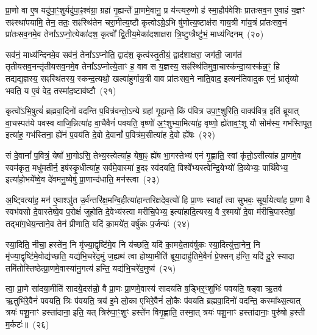 प्रा॒णो वा ए॒ष यदु॑पा॒ꣳ॒शुर्यदु॑पा॒ꣴ॒श्व॑ग्रा॒ ग्रहा॑ गृ॒ह्यन्ते᳚ प्रा॒णमे॒वानु॒ प्र य॑न्त्यरु॒णो ह॑ स्मा॒हौप॑वेशिः प्रातःसव॒न ए॒वाहं य॒ज्ञꣳ सꣴस्था॑पयामि॒ तेन॒ ततः॒ सꣴस्थि॑तेन चरा॒मीत्य॒ष्टौ कृत्वो\-ऽग्रे॒\-ऽभि षु॑णोत्य॒ष्टाक्ष॑रा गाय॒त्री गा॑य॒त्रं प्रा॑तःसव॒नं प्रा॑तःसव॒नमे॒व तेना᳚\-ऽऽ\-प्नो॒त्येका॑\-दश॒ कृत्वो᳚ द्वि॒तीय॒मेका॑\-दशाक्षरा त्रि॒ष्टुप्त्रैष्टु॑भं॒ माध्य॑न्दिनम्~(२०)\ip

सव॑नं॒ माध्य॑न्दिनमे॒व सव॑नं॒ तेना᳚\-ऽऽ\-प्नोति॒ द्वाद॑श॒ कृत्व॑स्तृ॒तीयं॒ द्वाद॑शाक्षरा॒ जग॑ती॒ जाग॑तं तृतीय\-सव॒नन्तृ॑तीय\-सव॒नमे॒व तेना᳚\-ऽऽ\-प्नोत्ये॒ताꣳ ह॒ वाव स य॒ज्ञस्य॒ सꣴस्थि॑तिमुवा॒चास्क॑न्दा॒यास्क॑न्न॒ꣳ॒ हि तद्यद्य॒ज्ञस्य॒ सꣴस्थि॑तस्य॒ स्कन्द॒त्यथो॒ खल्वा॑हुर्गाय॒त्री वाव प्रा॑तःसव॒ने नाति॒वाद॒ इत्यन॑तिवादुक एनं॒ भ्रातृ॑व्यो भवति॒ य ए॒वं वेद॒ तस्मा॑द॒ष्टाव॑ष्टौ~(२१)\ip

कृत्वो॑\-ऽभि॒षुत्यं॑ ब्रह्मवा॒दिनो॑ वदन्ति प॒वित्र॑वन्तो॒\-ऽन्ये ग्रहा॑ गृ॒ह्यन्ते॒ किं प॑वित्र उपा॒ꣳ॒शुरिति॒ वाक्प॑वित्र॒ इति॑ ब्रूयात् वा॒चस्पत॑ये पवस्व वाजि॒न्नित्या॑ह वा॒चैवैनं॑ पवयति॒ वृष्णो॑ अ॒ꣳ॒शुभ्या॒मित्या॑ह॒ वृष्णो॒ ह्ये॑ताव॒ꣳ॒शू यौ सोम॑स्य॒ गभ॑स्तिपूत॒ इत्या॑ह॒ गभ॑स्तिना॒ ह्ये॑नं प॒वय॑ति दे॒वो दे॒वानां᳚ प॒वित्र॑म॒सीत्या॑ह दे॒वो ह्ये॑षः~(२२)\ip

सं दे॒वानां᳚ प॒वित्रं॒ येषां᳚ भा॒गो\-ऽसि॒ तेभ्य॒स्त्वेत्या॑ह॒ येषा॒ꣴ॒ ह्ये॑ष भा॒गस्तेभ्य॑ एनं गृ॒ह्णाति॒ स्वां कृ॑तो॒\-ऽसीत्या॑ह प्रा॒णमे॒व स्वम॑कृत॒ मधु॑मतीर्न॒ इष॑स्कृ॒धीत्या॑ह॒ सर्व॑मे॒वास्मा॑ इ॒दꣴ स्व॑दयति॒ विश्वे᳚भ्यस्त्वेन्द्रि॒येभ्यो॑ दि॒व्येभ्यः॒ पार्थि॑वेभ्य॒ इत्या॑हो॒भये᳚ष्वे॒व दे॑वमनु॒ष्येषु॑ प्रा॒णान्द॑धाति॒ मन॑स्त्वा~(२३)\ip

अ॒ष्ट्वित्या॑ह॒ मन॑ ए॒वाश्ञु॑त उ॒र्व॑न्तरि॑क्ष॒मन्वि॒हीत्या॑हान्तरिक्षदेव॒त्यो॑ हि प्रा॒णः स्वाहा᳚ त्वा सुभवः॒ सूर्या॒येत्या॑ह प्रा॒णा वै स्वभ॑वसो दे॒वास्तेष्वे॒व प॒रोक्षं॑ जुहोति दे॒वेभ्य॑स्त्वा मरीचि॒पेभ्य॒ इत्या॑हादि॒त्यस्य॒ वै र॒श्मयो॑ दे॒वा म॑रीचि॒पास्तेषां॒ तद्भा॑ग॒धेय॒न्ताने॒व तेन॑ प्रीणाति॒ यदि॑ का॒मये॑त॒ वर्\mbox{}षु॑कः प॒र्जन्यः॑~(२४)\ip

स्या॒दिति॒ नीचा॒ हस्ते॑न॒ नि मृ॑ज्या॒द्वृष्टि॑मे॒व नि य॑च्छति॒ यदि॑ का॒मये॒ताव॑र्\mbox{}षुकः स्या॒दित्यु॑त्ता॒नेन॒ नि मृ॑ज्या॒द्वृष्टि॑मे॒वोद्य॑च्छति॒ यद्य॑भि॒चरे॑द॒मुं ज॒ह्यथ॑ त्वा होष्या॒मीति॑ ब्रूया॒दाहु॑तिमे॒वैनं॑ प्रे॒फ्सन् ह॑न्ति॒ यदि॑ दू॒रे स्यादा तमि॑तोस्तिष्ठेत्प्रा॒णमे॒वास्या॑नु॒गत्य॑ हन्ति॒ यद्य॑भि॒चरे॑द॒मुष्य॑~(२५)\ip

त्वा॒ प्रा॒णे सा॑दया॒मीति॑ सादये॒दस॑न्नो॒ वै प्रा॒णः प्रा॒णमे॒वास्य॑ सादयति ष॒ड्भिर॒ꣳ॒शुभिः॑ पवयति॒ षड्वा ऋ॒तव॑ ऋ॒तुभि॑रे॒वैनं॑ पवयति॒ त्रिः प॑वयति॒ त्रय॑ इ॒मे लो॒का ए॒भिरे॒वैनं॑ लो॒कैः प॑वयति ब्रह्मवा॒दिनो॑ वदन्ति॒ कस्मा᳚थ्स॒त्यात् त्रयः॑ पशू॒नाꣳ हस्ता॑दाना॒ इति॒ यत् त्रिरु॑पा॒ꣳ॒शुꣳ हस्ते॑न विगृ॒ह्णाति॒ तस्मा॒त् त्रयः॑ पशू॒नाꣳ हस्ता॑दानाः॒ पुरु॑षो ह॒स्ती म॒र्कटः॑॥~(२६)\ip

